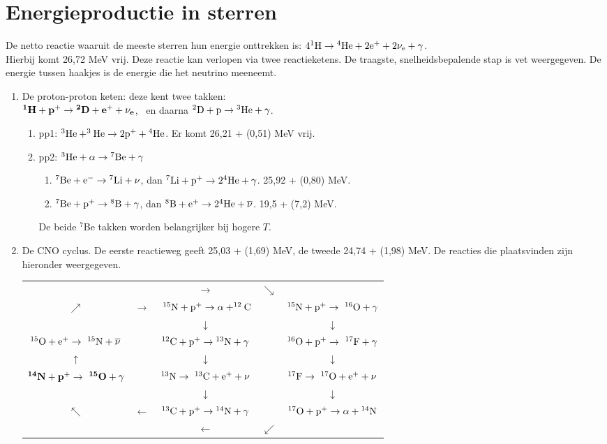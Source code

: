 \documentclass[twoside]{report}
\begin{document}
\section{Energieproductie in sterren}
De netto reactie waaruit de meeste sterren hun energie onttrekken is:
$\rm 4 ^1H\rightarrow{}^4He+2e^++2\nu_{\rm e}+\gamma$.\\
Hierbij komt 26,72 MeV vrij. Deze reactie kan verlopen via twee reactieketens.
De traagste, snelheidsbepalende stap is vet weergegeven. De energie tussen
haakjes is de energie die het neutrino meeneemt.
\begin{enumerate}
\item De proton-proton keten: deze kent twee takken:\\
\boldmath$\bf ^1H+p^+\rightarrow{}^2D+e^++\nu_{\bf e}$,\unboldmath
~en daarna $\rm ^2D+p\rightarrow{}^3He+\gamma$.
      \begin{enumerate}
      \item pp1: $\rm ^3He+^3He\rightarrow2p^++{}^4He$. Er komt 26,21 + (0,51)
            MeV vrij.
      \item pp2: $\rm ^3He+\alpha\rightarrow{}^7Be+\gamma$
            \begin{enumerate}
            \item $\rm ^7Be+e^-\rightarrow{^7Li}+\nu$, dan $\rm ^7Li+p^+\rightarrow2 ^4He+\gamma$.
                  25,92 + (0,80) MeV.
            \item $\rm ^7Be+p^+\rightarrow{^8B}+\gamma$, dan $\rm ^8B+e^+\rightarrow2^4He+\overline{\nu}$.
                  19,5 + (7,2) MeV.
            \end{enumerate}
            De beide $^7$Be takken worden belangrijker bij hogere $T$.
      \end{enumerate}
\item De CNO cyclus. De eerste reactieweg geeft 25,03 + (1,69) MeV, de tweede
24,74 + (1,98) MeV. De reacties die plaatsvinden zijn hieronder weergegeven.
\npar
\begin{tabular}{ccccc}
&&$\longrightarrow$&$\searrow$&\\
$\nearrow$&$\rightarrow$&$\rm~^{15}N+p^+\rightarrow\alpha+^{12}C$&&$\rm^{15}N+p^+\rightarrow~^{16}O+\gamma$\\
&&$\downarrow$&&$\downarrow$\\
$\rm^{15}O+e^+\rightarrow~^{15}N+\overline{\nu}$&&$\rm^{12}C+p^+\rightarrow{}^{13}N+\gamma$&&$\rm^{16}O+p^+\rightarrow~^{17}F+\gamma$\\
$\uparrow$&&$\downarrow$&&$\downarrow$\\
\boldmath$\bf ^{14}N+p^+\rightarrow~^{15}O+\gamma$\unboldmath&&$\rm^{13}N\rightarrow~^{13}C+e^++\nu$&&$\rm^{17}F\rightarrow~^{17}O+e^++\nu$\\
&&$\downarrow$&&$\downarrow$\\
$\nwarrow$&$\leftarrow$&$\rm ^{13}C+p^+\rightarrow{}^{14}N+\gamma$&&$\rm^{17}O+p^+\rightarrow\alpha+{}^{14}N$\\
&&$\longleftarrow$&$\swarrow$&
\end{tabular}
\end{enumerate}
\end{document}
